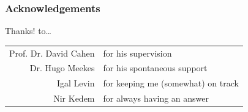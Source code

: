 \documentclass{beamer}
\begin{document}
\begin{frame}
\frametitle{Acknowledgements}
\begin{block}{Thanks! to\dots}
\centering
	\begin{tabular}{r l}
	\textcolor{RUred}{Prof. Dr. David Cahen} & for his supervision \\
	\textcolor{RUred}{Dr. Hugo Meekes} & for his spontaneous support \\
	\textcolor{RUred}{Igal Levin} & for keeping me (somewhat) on track \\
	\textcolor{RUred}{Nir Kedem} & for always having an answer
	\end{tabular}
\end{block}\end{frame}
\end{document}
